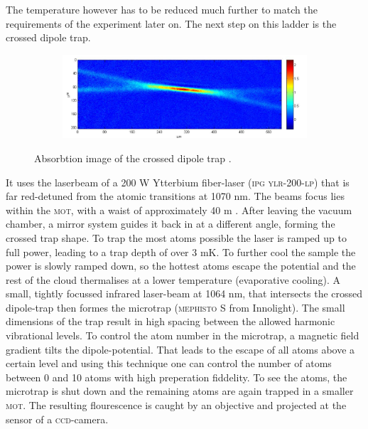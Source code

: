 The temperature however has to be reduced much further to match the requirements of the experiment later on. The next step on this ladder is the crossed dipole trap. \begin{figure}[h]
\centering
\begin{subfigure}[b]{0.8\textwidth}
                \includegraphics[width=\textwidth]{dipolefoto}
\end{subfigure}
\caption{Absorbtion image of the crossed dipole trap \cite{lompe}.}
\label{experiment}
\end{figure}
It uses the laserbeam of a 200 W Ytterbium fiber-laser (\textsc{ipg ylr-200-lp}) that is far red-detuned from the atomic transitions at 1070 nm. The beams focus lies within the \textsc{mot}, with a waist of approximately 40 \mu m \cite{lompe}. After leaving the vacuum chamber, a mirror system guides it back in at a different angle, forming the crossed trap shape. To trap the most atoms possible the laser is ramped up to full power, leading to a trap depth of over 3 mK. To further cool the sample the power is slowly ramped down, so the hottest atoms escape the potential and the rest of the cloud thermalises at a lower temperature (evaporative cooling). A small, tightly focussed infrared laser-beam at 1064 nm, that intersects the crossed dipole-trap then formes the microtrap (\textsc{mephisto S} from Innolight). The small dimensions of the trap result in high spacing between the allowed harmonic vibrational levels. To control the atom number in the microtrap, a magnetic field gradient tilts the dipole-potential. That leads to the escape of all atoms above a certain level and using this technique one can control the number of atoms between 0 and 10 atoms with high preperation fiddelity. To see the atoms, the microtrap is shut down and the remaining atoms are again trapped in a smaller \textsc{mot}. The resulting flourescence is caught by an objective and projected at the sensor of a \textsc{ccd}-camera. 


